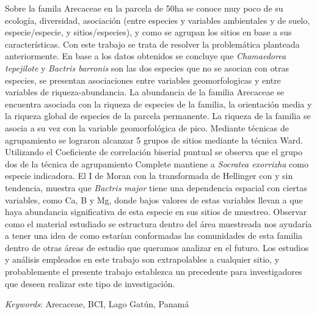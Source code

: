 \documentclass[11pt,]{article}
\renewenvironment{abstract}
 {{%
    \setlength{\leftmargin}{0mm}
    \setlength{\rightmargin}{\leftmargin}%
  }%
  \relax}
 {\endlist}
\begin{document}
\begin{abstract}

    \hbox{\vrule height .2pt width 39.14pc}

    \vskip 8.5pt %

\noindent Sobre la famila Arecaceae en la parcela de 50ha se conoce muy poco de su
ecología, diversidad, asociación (entre especies y variables ambientales
y de suelo, especie/especie, y sitios/especies), y como se agrupan los
sitios en base a sus características. Con este trabajo se trata de
resolver la problemática planteada anteriormente. En base a los datos
obtenidos se concluye que \emph{Chamaedorea tepejilote} y \emph{Bactris
barronis} son las dos especies que no se asocian con otras especies, se
presentan asociaciones entre variables geomorfologicas y entre variables
de riqueza-abundancia. La abundancia de la familia Arecaceae se
encuentra asociada con la riqueza de especies de la familia, la
orientación media y la riqueza global de especies de la parcela
permanente. La riqueza de la familia se asocia a su vez con la variable
geomorfológica de pico. Mediante técnicas de agrupamiento se lograron
alcanzar 5 grupos de sitios mediante la técnica Ward. Utilizando el
Coeficiente de correlación biserial puntual se observa que el grupo dos
de la técnica de agrupamiento Complete mantiene a \emph{Socratea
exorrizha} como especie indicadora. El I de Moran con la transformada de
Hellinger con y sin tendencia, muestra que \emph{Bactris major} tiene
una dependencia espacial con ciertas variables, como Ca, B y Mg, donde
bajos valores de estas variables llevan a que haya abundancia
significativa de esta especie en sus sitios de muestreo. Observar como
el material estudiado se estructura dentro del área muestreada nos
ayudaría a tener una idea de como estarían conformadas las comunidades
de esta familia dentro de otras áreas de estudio que queramos analizar
en el futuro. Los estudios y análisis empleados en este trabajo son
extrapolables a cualquier sitio, y probablemente el presente trabajo
establezca un precedente para investigadores que deseen realizar este
tipo de investigación.


\vskip 8.5pt \noindent \emph{Keywords}: Arecaceae, BCI, Lago Gatún, Panamá \par

    \hbox{\vrule height .2pt width 39.14pc}



\end{abstract}


\vskip 6.5pt
\end{document}
